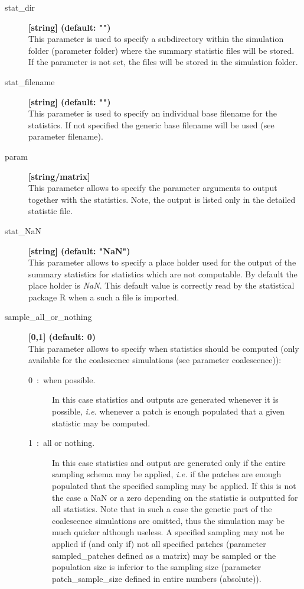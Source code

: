 \documentclass[letterpaper,12pt,oneside]{book}
\begin{document}
\begin{description}
\item[stat\_dir] \textbf{[string] (default: "")}\\
This parameter is used to specify a subdirectory within the simulation folder (parameter \textsf{folder}) where the summary statistic files will be stored. If the parameter is not set, the files will be stored in the simulation folder.

\item[stat\_filename] \textbf{[string] (default: "")}\\
This parameter is used to specify an individual base filename for the statistics. If not specified the generic base filename will be used (see parameter \textsf{filename}).



\item[param] \textbf{[string/matrix]}\\
This parameter allows to specify the parameter arguments to output together with the statistics. Note, the output is listed only in the detailed statistic file.

\item[stat\_NaN] \textbf{[string] (default: "NaN")}\\
This parameter allows to specify a place holder used for the output of the summary statistics for statistics which are not computable. By default the place holder is \textit{NaN}. This default value is correctly read by the statistical package R when a such a file is imported.

\item[sample\_all\_or\_nothing] \textbf{[0,1] (default: 0)}\\
This parameter allows to specify when statistics should be computed (only available for the coalescence simulations (see parameter \textsf{coalescence})):
\begin{description}
\item[0~:~when possible.] In this case statistics and outputs are generated whenever it is possible, \textit{i.e.} whenever a patch is enough populated that a given statistic may be computed.
\item[1~:~all or nothing.] In this case statistics and output are generated only if the entire sampling schema may be applied, \textit{i.e.} if the patches are enough populated that the specified sampling may be applied. If this is not the case a NaN or a zero depending on the statistic is outputted for all statistics. Note that in such a case the genetic part of the coalescence simulations are omitted, thus the simulation may be much quicker although useless. A specified sampling may not be applied if (and only if) not all specified patches (parameter \textsf{sampled\_patches} defined as a matrix) may be sampled or the population size is inferior to the sampling size (parameter \textsf{patch\_sample\_size} defined in entire numbers (absolute)).
\end{description}
\end{description}
\end{document}
